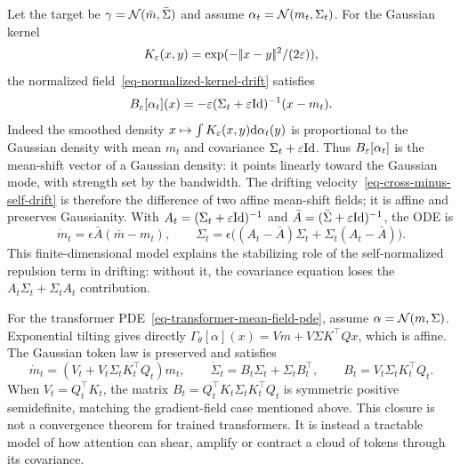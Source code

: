\begin{example}
	Let the target be $\gamma=\mathcal{N}(\bar m,\bar\Sigma)$ and assume $\alpha_t=\mathcal{N}(m_t,\Sigma_t)$. For the Gaussian kernel
	\[
		K_\varepsilon(x,y)=\exp(-|\!| x-y |\!|^2/(2\varepsilon)),
	\]
	the normalized field~\eqref{eq-normalized-kernel-drift} satisfies
	\[
		B_\varepsilon[\alpha_t](x)
		=
		-\varepsilon(\Sigma_t+\varepsilon\mathrm{Id})^{-1}(x-m_t).
	\]
	Indeed the smoothed density \(x\mapsto\int K_\varepsilon(x,y)\mathrm{d}\alpha_t(y)\) is proportional to the Gaussian density with mean $m_t$ and covariance $\Sigma_t+\varepsilon\mathrm{Id}$. Thus \(B_\varepsilon[\alpha_t]\) is the mean-shift vector of a Gaussian density: it points linearly toward the Gaussian mode, with strength set by the bandwidth. The drifting velocity~\eqref{eq-cross-minus-self-drift} is therefore the difference of two affine mean-shift fields; it is affine and preserves Gaussianity. With $A_t=(\Sigma_t+\varepsilon\mathrm{Id})^{-1}$ and $\bar A=(\bar\Sigma+\varepsilon\mathrm{Id})^{-1}$, the ODE is
	\[
		\dot m_t=\epsilon\bar A(\bar m-m_t),
		\qquad
		\dot\Sigma_t=\epsilon\bigl((A_t-\bar A)\Sigma_t+\Sigma_t(A_t-\bar A)\bigr).
	\]
	This finite-dimensional model explains the stabilizing role of the self-normalized repulsion term in drifting: without it, the covariance equation loses the $A_t\Sigma_t+\Sigma_tA_t$ contribution.
\end{example}

\begin{example}
	For the transformer PDE~\eqref{eq-transformer-mean-field-pde}, assume $\alpha=\mathcal{N}(m,\Sigma)$. Exponential tilting gives directly
	$\Gamma_\theta[\alpha](x)=Vm+V\Sigma K^\top Qx$, which is affine. The Gaussian token law is preserved and satisfies
	\[
		\dot m_t=(V_t+V_t\Sigma_tK_t^\top Q_t)m_t,
		\qquad
		\dot\Sigma_t=B_t\Sigma_t+\Sigma_tB_t^\top,
		\qquad
		B_t=V_t\Sigma_tK_t^\top Q_t.
	\]
	When $V_t=Q_t^\top K_t$, the matrix $B_t=Q_t^\top K_t\Sigma_tK_t^\top Q_t$ is symmetric positive semidefinite, matching the gradient-field case mentioned above.
	This closure is not a convergence theorem for trained transformers. It is instead a tractable model of how attention can shear, amplify or contract a cloud of tokens through its covariance.
\end{example}

